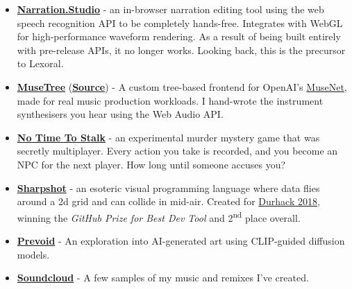 \documentclass[hidelinks, 12pt, a4paper]{article}
\begin{document}
	\begin{itemize}
		\item \begin{small}\href{https://github.com/stevenwaterman/narration.studio}{\textbf{Narration.Studio}} - an in-browser narration editing tool using the web speech recognition API to be completely hands-free. Integrates with WebGL for high-performance waveform rendering. As a result of being built entirely with pre-release APIs, it no longer works. Looking back, this is the precursor to Lexoral.\end{small}
		
		\item \begin{small} \href{https://stevenwaterman.uk/musetree/}{\textbf{MuseTree}} (\href{https://github.com/stevenwaterman/musetree}{\textbf{Source}}) - A custom tree-based frontend for OpenAI's \href{https://openai.com/blog/musenet/}{MuseNet}, made for real music production workloads. I hand-wrote the instrument synthesisers you hear using the Web Audio API.\end{small}
		
		\item \begin{small}\href{https://github.com/stevenwaterman/NoTimeToStalk}{\textbf{No Time To Stalk}} - an experimental murder mystery game that was secretly multiplayer. Every action you take is recorded, and you become an NPC for the next player. How long until someone accuses you?\end{small}
		
		\item \begin{small}\href{https://github.com/stevenwaterman/sharpshot}{\textbf{Sharpshot}} - an esoteric visual programming language where data flies around a 2d grid and can collide in mid-air. Created for \href{http://www.durhack.com}{Durhack 2018}, winning the \emph{GitHub Prize for Best Dev Tool} and 2\textsuperscript{nd} place overall.\end{small}
		
		\item \begin{small}\href{https://linktr.ee/prevoid_art}{\textbf{Prevoid}} - An exploration into AI-generated art using CLIP-guided diffusion models.\end{small}
		
		\item \begin{small}\href{https://soundcloud.com/user-872603169/welcome-to-the-theatre}{\textbf{Soundcloud}} - A few samples of my music and remixes I've created.\end{small}
	\end{itemize}
\end{document}
